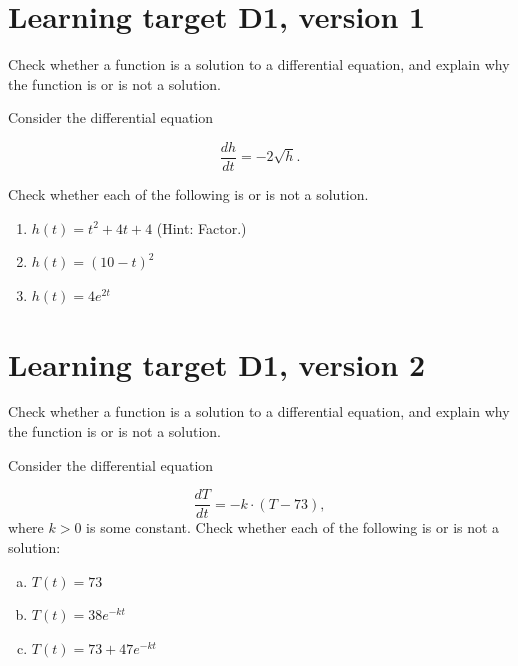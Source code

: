 




\everymath{\displaystyle}

\section{Learning target D1, version 1}

Check whether a function is a solution to a differential equation, and explain why the function is or is not a solution.

\hrulefill

Consider the differential equation

\[ \dfrac{dh}{dt} = -2 \sqrt{h}.
\]

Check whether each of the following is or is not a solution. 
\begin{enumerate}
	\item $h(t) = t^2 + 4t + 4$ (Hint: Factor.)
	\vfill
	\item $h(t) = (10 - t)^2$
	\vfill
	\item $h(t) = 4e^{2t}$
	\vfill
\end{enumerate}
\pagebreak

\section{Learning target D1, version 2}

Check whether a function is a solution to a differential equation, and explain why the function is or is not a solution.

\hrulefill

Consider the differential equation

\[\dfrac{dT}{dt} = -k \cdot(T-73),
\]
where $k>0$ is some constant. Check whether each of the following is or is not a solution: 
\begin{enumerate}[(a)]
	\item $T(t) = 73$
	\vfill
	\item $T(t) = 38 e^{-kt}$
	\vfill
	\item $T(t) = 73+47e^{-kt}$
	\vfill
\end{enumerate}

